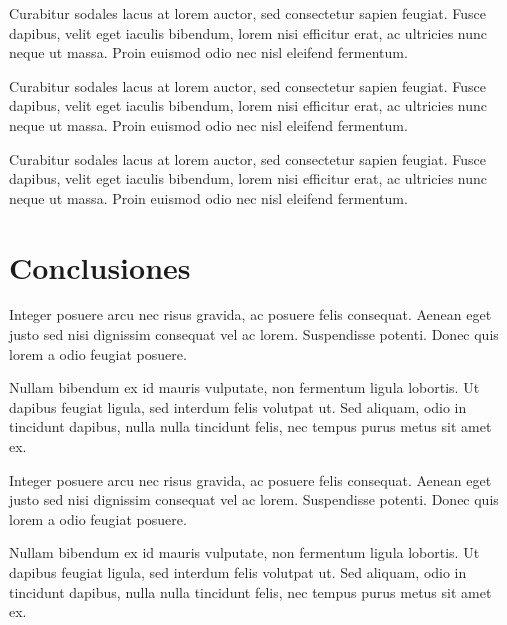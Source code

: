 Curabitur sodales lacus at lorem auctor, sed consectetur sapien feugiat. Fusce dapibus, velit eget iaculis bibendum, lorem nisi efficitur erat, ac ultricies nunc neque ut massa. Proin euismod odio nec nisl eleifend fermentum.

Curabitur sodales lacus at lorem auctor, sed consectetur sapien feugiat. Fusce dapibus, velit eget iaculis bibendum, lorem nisi efficitur erat, ac ultricies nunc neque ut massa. Proin euismod odio nec nisl eleifend fermentum.

Curabitur sodales lacus at lorem auctor, sed consectetur sapien feugiat. Fusce dapibus, velit eget iaculis bibendum, lorem nisi efficitur erat, ac ultricies nunc neque ut massa. Proin euismod odio nec nisl eleifend fermentum.

\section{Conclusiones}

Integer posuere arcu nec risus gravida, ac posuere felis consequat. Aenean eget justo sed nisi dignissim consequat vel ac lorem. Suspendisse potenti. Donec quis lorem a odio feugiat posuere.

Nullam bibendum ex id mauris vulputate, non fermentum ligula lobortis. Ut dapibus feugiat ligula, sed interdum felis volutpat ut. Sed aliquam, odio in tincidunt dapibus, nulla nulla tincidunt felis, nec tempus purus metus sit amet ex.


Integer posuere arcu nec risus gravida, ac posuere felis consequat. Aenean eget justo sed nisi dignissim consequat vel ac lorem. Suspendisse potenti. Donec quis lorem a odio feugiat posuere.

Nullam bibendum ex id mauris vulputate, non fermentum ligula lobortis. Ut dapibus feugiat ligula, sed interdum felis volutpat ut. Sed aliquam, odio in tincidunt dapibus, nulla nulla tincidunt felis, nec tempus purus metus sit amet ex.

